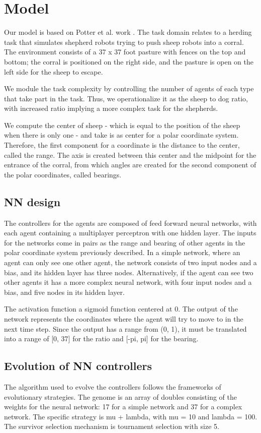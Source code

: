 \documentclass[conference]{IEEEtran}
\begin{document}
\section{Model}
Our model is based on Potter et al. work \cite{potter2001heterogeneity}. The task domain relates to a herding task that simulates shepherd robots trying to push sheep robots into a corral. The environment consists of a 37 x 37 foot pasture with fences on the top and bottom; the corral is positioned on the right side, and the pasture is open on the left side for the sheep to escape.

We module the task complexity by controlling the number of agents of each type that take part in the task. Thus, we operationalize it as the sheep to dog ratio, with increased ratio implying a more complex task for the shepherds.
 
We compute the center of sheep - which is equal to the position of the sheep when there is only one - and take is as center for a polar coordinate system. Therefore, the first component for a coordinate is the distance to the center, called the range. The axis is created between this center and the midpoint for the entrance of the corral, from which angles are created for the second component of the polar coordinates, called bearings. 



\subsection{NN design}
The controllers for the agents are composed of feed forward neural networks, with each agent containing a multiplayer perceptron with one hidden layer. The inputs for the networks come in pairs as the range and bearing of other agents in the polar coordinate system previously described. In a simple network, where an agent can only see one other agent, the network consists of two input nodes and a bias, and its hidden layer has three nodes. Alternatively, if the agent can see two other agents it has a more complex neural network, with four input nodes and a bias, and five nodes in its hidden layer. 

The activation function a sigmoid function centered at 0. The output of the network represents the coordinates where the agent will try to move to in the next time step. Since the output has a range from (0, 1), it must be translated into a range of [0, 37] for the ratio and [-pi, pi] for the bearing. 
 

\subsection{Evolution of NN controllers}
The algorithm used to evolve the controllers follows the frameworks of evolutionary strategies. The genome is an array of doubles consisting of the weights for the neural network: 17 for a simple network and 37 for a complex network. The specific strategy is mu + lambda, with mu = 10 and lambda = 100. The survivor selection mechanism is tournament selection with size 5. 
\end{document}
